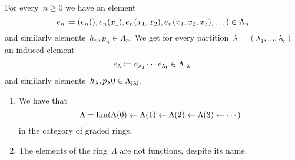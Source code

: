 \documentclass[a4paper,10pt]{scrartcl}
\begin{document}
\begin{example}
  For every~$n \geq 0$ we have an element
  \[
    e_n
    \coloneqq
    (e_n(), e_n(x_1), e_n(x_1, x_2), e_n(x_1, x_2, x_3), \dotsc)
    \in
    \Lambda_n
  \]
  and similarly elements~$h_n, p_n \in \Lambda_n$.
  We get for every partition~$\lambda = (\lambda_1, \dotsc, \lambda_t)$ an induced element
  \[
    e_{\lambda}
    \coloneqq
    e_{\lambda_1} \dotsm e_{\lambda_t}
    \in
    \Lambda_{\lvert\lambda\rvert}
  \]
  and similarly elements~$h_{\lambda}, p_{\lambda}0\in \Lambda_{\lvert\lambda\rvert}$.
\end{example}

\begin{remark}
  \leavevmode
  \begin{enumerate}
    \item
      We have that
      \[
        \Lambda
        =
        \lim( \Lambda(0) \leftarrow \Lambda(1) \leftarrow \Lambda(2) \leftarrow \Lambda(3) \leftarrow \dotsb)
      \]
      in the category of graded rings.
    \item
      The elements of the ring~$\Lambda$ are not functions, despite its name.
  \end{enumerate}
\end{remark}
\end{document}
